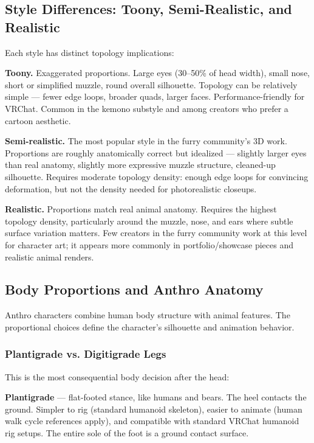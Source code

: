 \subsection{Style Differences: Toony, Semi-Realistic, and Realistic}

Each style has distinct topology implications:

\begin{furrybox}
\textbf{Toony.} Exaggerated proportions. Large eyes (30--50\% of head width), small nose, short or simplified muzzle, round overall silhouette. Topology can be relatively simple --- fewer edge loops, broader quads, larger faces. Performance-friendly for VRChat. Common in the kemono substyle and among creators who prefer a cartoon aesthetic.
\end{furrybox}

\textbf{Semi-realistic.} The most popular style in the furry community's 3D work. Proportions are roughly anatomically correct but idealized --- slightly larger eyes than real anatomy, slightly more expressive muzzle structure, cleaned-up silhouette. Requires moderate topology density: enough edge loops for convincing deformation, but not the density needed for photorealistic closeups.

\textbf{Realistic.} Proportions match real animal anatomy. Requires the highest topology density, particularly around the muzzle, nose, and ears where subtle surface variation matters. Few creators in the furry community work at this level for character art; it appears more commonly in portfolio/showcase pieces and realistic animal renders.


\subsection{Body Proportions and Anthro Anatomy}

Anthro characters combine human body structure with animal features. The proportional choices define the character's silhouette and animation behavior.

\subsubsection{Plantigrade vs. Digitigrade Legs}

This is the most consequential body decision after the head:

\textbf{Plantigrade} --- flat-footed stance, like humans and bears. The heel contacts the ground. Simpler to rig (standard humanoid skeleton), easier to animate (human walk cycle references apply), and compatible with standard VRChat humanoid rig setups. The entire sole of the foot is a ground contact surface.

